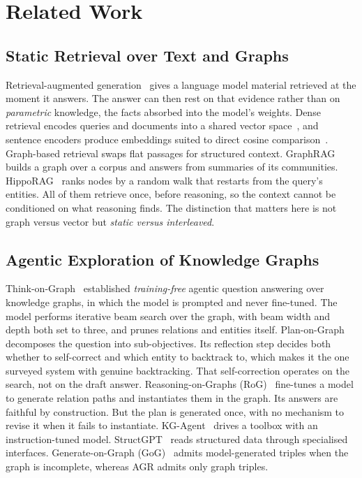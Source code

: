 %
\section{Related Work}\label{sec:related}

\subsection{Static Retrieval over Text and Graphs}

Retrieval-augmented generation~\cite{lewis2020retrieval} gives a language model
material retrieved at the moment it answers. The answer can then rest on that
evidence rather than on \emph{parametric} knowledge, the facts absorbed into the
model's weights. Dense retrieval encodes queries and documents into a shared
vector space~\cite{karpukhin2020dense}, and sentence encoders produce embeddings
suited to direct cosine comparison~\cite{reimers2019sentence}. Graph-based
retrieval swaps flat passages for structured context.
GraphRAG~\cite{edge2024local} builds a graph over a corpus and answers from
summaries of its communities. HippoRAG~\cite{gutierrez2024hipporag} ranks nodes
by a random walk that restarts from the query's entities. All of them retrieve
once, before reasoning, so the context cannot be conditioned on what reasoning
finds. The distinction that matters here is not graph versus vector but
\emph{static versus interleaved}.

\subsection{Agentic Exploration of Knowledge Graphs}

Think-on-Graph~\cite{sun2024think} established \emph{training-free} agentic
question answering over knowledge graphs, in which the model is prompted and
never fine-tuned. The model performs iterative beam search over the graph, with
beam width and depth both set to three, and prunes relations and entities
itself. Plan-on-Graph~\cite{chen2024plan} decomposes the question into
sub-objectives. Its reflection step decides both whether to self-correct and
which entity to backtrack to, which makes it the one surveyed system with
genuine backtracking. That self-correction operates on the search, not on the
draft answer. Reasoning-on-Graphs (RoG)~\cite{luo2024reasoning} fine-tunes a
model to generate relation paths and instantiates them in the graph. Its answers
are faithful by construction. But the plan is generated once, with no mechanism
to revise it when it fails to instantiate. KG-Agent~\cite{jiang2024kgagent}
drives a toolbox with an instruction-tuned model.
StructGPT~\cite{jiang2023structgpt} reads structured data through specialised
interfaces. Generate-on-Graph (GoG)~\cite{xu2024generate} admits model-generated
triples when the graph is incomplete, whereas AGR admits only graph triples.

